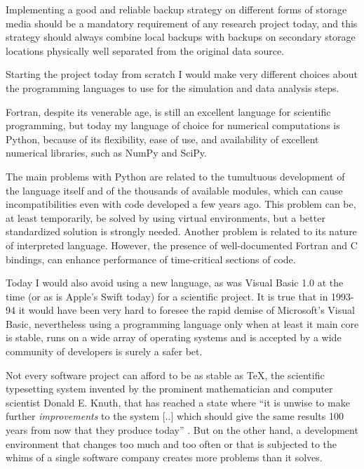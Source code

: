 Implementing a good and reliable backup strategy on different forms of storage media should be a mandatory requirement of any research project today, and this strategy should always combine local backups with backups on secondary storage locations physically well separated from the original data source. 

Starting the project today from scratch I would make very different choices about the programming languages to use for the simulation and data analysis steps.

Fortran, despite its venerable age, is still an excellent language for scientific programming, but today my language of choice for numerical computations is Python, because of its flexibility, ease of use, and  availability of excellent numerical libraries, such as NumPy and SciPy.

The main problems with Python are related to the tumultuous development of the language itself and of the thousands of available modules, which can cause incompatibilities even with code developed a few years ago. This problem can be, at least temporarily, be solved by using virtual environments, but a better standardized solution is strongly needed.
Another problem is related to its nature of interpreted language. However, the presence of well-documented Fortran and C bindings, can enhance performance of time-critical sections of code.

Today I would also avoid using a new language, as was Visual Basic 1.0 at the time (or as is Apple's Swift today) for a scientific project. 
It is true that in 1993-94 it would have been very hard to foresee the rapid demise of Microsoft's Visual Basic, nevertheless using a programming language only when at least it main core is stable, runs on a wide array of operating systems and is accepted by a wide community of developers is surely a safer bet.

Not every software project can afford to be as stable as \TeX, the scientific typesetting system invented by the prominent mathematician and computer scientist Donald E. Knuth, that has reached a state where ``it is unwise to make further \emph{improvements} to the system [..] which should give the same results 100 years from now that they produce today'' \cite{Knuth:1990}.
But on the other hand, a development environment that changes too much and too often or that is subjected to the whims of a single software company creates more problems than it solves. 



